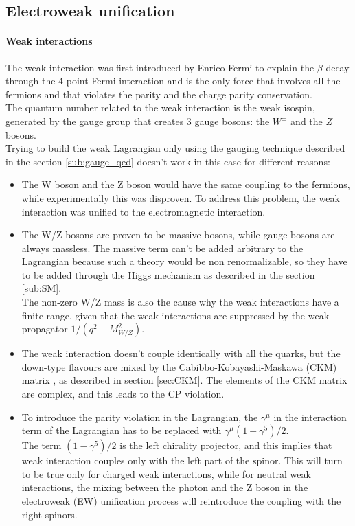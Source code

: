 \subsection{Electroweak unification}\label{sub:weak}
\paragraph*{Weak interactions}
The weak interaction was first introduced by Enrico Fermi to explain the $\beta$ decay through the 4 point Fermi interaction \cite{Fermi1934Tentativo} and is the only force that involves all the fermions and that violates the parity and the charge parity conservation. \\
The quantum number related to the weak interaction is the weak isospin, generated by the  gauge group that creates 3 gauge bosons: the $W^\pm$ and the $Z$ bosons.\\
Trying to build the weak Lagrangian only using the gauging technique described in the section \ref{sub:gauge_qed} doesn't work in this case for different reasons:
\begin{itemize}
    \item The W boson and the Z boson would have the same coupling to the fermions, while experimentally this was disproven. To address this problem, the weak interaction was unified to the electromagnetic interaction.
    \item The W/Z bosons are proven to be massive bosons, while gauge bosons are always massless. The massive term can't be added arbitrary to the Lagrangian because such a theory would be non renormalizable, so they have to be added through the Higgs mechanism as described in the section \ref{sub:SM}.\\
    The non-zero W/Z mass  is also the cause why the weak interactions have a finite range, given that the weak interactions are suppressed by the weak propagator $1/(q^2-M_{W/Z}^2)$.
    \item The weak interaction doesn't couple identically with all the quarks, but the down-type flavours are mixed by the Cabibbo-Kobayashi-Maskawa (CKM) matrix \cite{Kobayashi1973CP-ViolationInteraction}, as described in section \ref{sec:CKM}. The elements of the CKM matrix are complex, and this leads to the CP violation.
    \item To introduce the parity violation in the Lagrangian, the $\gamma^\mu$ in the interaction term of the Lagrangian has to be replaced with $\gamma^\mu \left(1-\gamma^5 \right)/2 $.\\
    The term $(1-\gamma^5)/2$ is the left chirality projector, and this implies that weak interaction couples only with the left part of the spinor. This will turn to be true only for charged weak interactions, while for neutral weak interactions, the mixing between the photon and the Z boson in the electroweak (EW) unification process will reintroduce the coupling with the right spinors.
\end{itemize}

